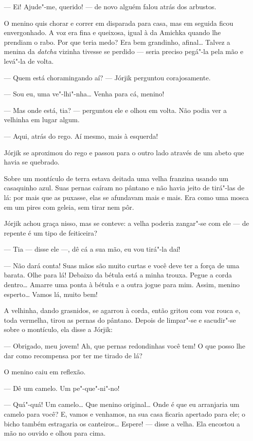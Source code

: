 --- Ei! Ajude"-me, querido! --- de novo alguém falou atrás dos arbustos.

O menino quis chorar e correr em disparada para casa, mas em seguida ficou
envergonhado. A voz era fina e queixosa, igual à da Amichka quando lhe
prendiam o rabo. Por que teria medo? Era bem grandinho, afinal\ldots{} Talvez
a menina da \emph{datcha} vizinha tivesse se perdido --- seria preciso
pegá"-la pela mão e levá"-la de volta.

--- Quem está choramingando aí? --- Jórjik perguntou corajosamente.

--- Sou eu, uma ve"-lhi"-nha\ldots{} Venha para cá, menino!

--- Mas onde está, tia? --- perguntou ele e olhou em volta. Não podia
ver a velhinha em lugar algum.

--- Aqui, atrás do rego. Aí mesmo, mais à esquerda!

Jórjik se aproximou do rego e passou para o outro lado através de um
abeto que havia se quebrado.

Sobre um montículo de terra estava deitada uma velha franzina usando um
casaquinho azul. Suas pernas caíram no pântano e não havia jeito de
tirá"-las de lá: por mais que as puxasse, elas se afundavam mais e mais.
Era como uma mosca em um pires com geleia, sem tirar nem pôr.

Jórjik achou graça nisso, mas se conteve: a velha poderia zangar"-se com
ele --- de repente é um tipo de feiticeira?

--- Tia --- disse ele ---, dê cá a sua mão, eu vou tirá"-la daí!

--- Não dará conta! Suas mãos são muito curtas e você deve ter a força
de uma barata. Olhe para lá! Debaixo da bétula está a minha trouxa.
Pegue a corda dentro\ldots{} Amarre uma ponta à bétula e a outra jogue
para mim. Assim, menino esperto\ldots{} Vamos lá, muito bem!

A velhinha, dando grasnidos, se agarrou à corda, então gritou com voz
rouca e, toda vermelha, tirou as pernas do pântano. Depois de limpar"-se
e sacudir"-se sobre o montículo, ela disse a Jórjik:

--- Obrigado, meu jovem! Ah, que pernas redondinhas você tem! O que
posso lhe dar como recompensa por ter me tirado de lá?

O menino caiu em reflexão.

--- Dê um camelo. Um pe"-que"-ni"-no!

--- Quá"-quá! Um camelo\ldots{} Que menino original\ldots{} Onde é que eu
arranjaria um camelo para você? E, vamos e venhamos, na sua casa ficaria
apertado para ele; o bicho também estragaria os canteiros\ldots{} Espere! ---
disse a velha. Ela encostou a mão no ouvido e olhou para cima.

